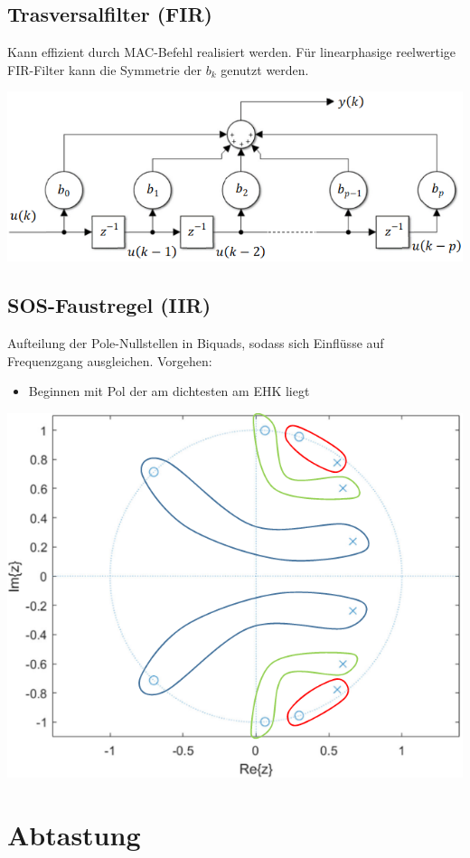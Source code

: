 \documentclass[10pt,a4paper]{article}
\begin{document}
\subsection{Trasversalfilter (FIR)}
Kann effizient durch MAC-Befehl realisiert werden. 
Für linearphasige reelwertige FIR-Filter kann die Symmetrie der $b_k$ genutzt werden.
  \begin{center}
      \includegraphics[width=.35\textwidth]{./img/trans.png}
  \end{center}
\subsection{SOS-Faustregel (IIR)}
Aufteilung der Pole-Nullstellen in Biquads, sodass sich Einflüsse auf Frequenzgang ausgleichen.
Vorgehen:
\begin{itemize}
    \item Beginnen mit Pol der am dichtesten am EHK liegt
\end{itemize}
  \begin{center}
      \includegraphics[width=.35\textwidth]{./img/biquad.png}
  \end{center}
\section{Abtastung}
\end{document}
